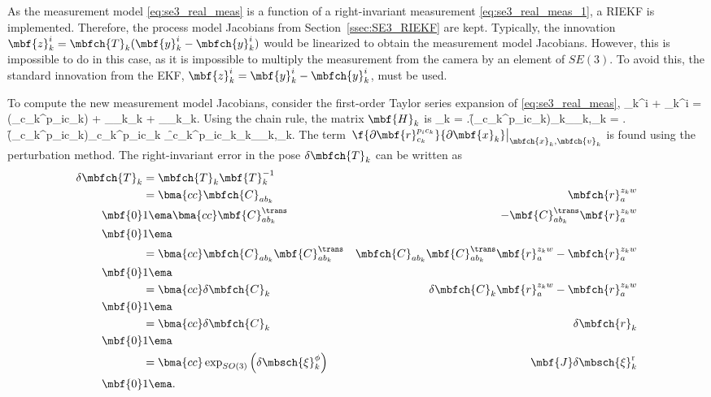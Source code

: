 As the measurement model \eqref{eq:se3_real_meas} is a function of a right-invariant measurement \eqref{eq:se3_real_meas_1}, a RIEKF is implemented. Therefore, the process model Jacobians from Section~\ref{ssec:SE3_RIEKF} are kept. Typically, the innovation $\mbf{z}_k^i = \mbfch{T}_k(\mbf{y}_k^i - \mbfch{y}_k^i)$ would be linearized to obtain the measurement model Jacobians. However, this is impossible to do in this case, as it is impossible to multiply the measurement from the camera by an element of $SE(3)$.  To avoid this, the standard innovation from the EKF, $\mbf{z}_k^i = \mbf{y}_k^i - \mbfch{y}_k^i$, must be used. 

To compute the new measurement model Jacobians, consider the first-order Taylor series expansion of \eqref{eq:se3_real_meas},
\bdis
	_k^i + _k^i =  (_{c_k}^{p_ic_k}) + _{_k}_k + _{_k}_k.
\edis
Using the chain rule, the matrix $\mbf{H}_k$ is
\bdis
	_k = \left.\f{\partial {}(_{c_k}^{p_ic_k})}{\partial {}_k}\right\rvert_{_k,_k} = \left.\f{\partial {}(_{c_k}^{p_ic_k})}{\partial  {}_{c_k}^{p_ic_k}} \f{\partial  {}_{c_k}^{p_ic_k}}{\partial {}_k}\right\rvert_{_k,_k}.
\edis
The term $\left.\f{\partial  \mbf{r}_{c_k}^{p_ic_k}}{\partial \mbf{x}_k}\right\rvert_{\mbfch{x}_k,\mbfch{v}_k}$ is found using the perturbation method. The right-invariant error in the pose $\delta \mbfch{T}_k$ can be written as
\begin{align*}
	\delta \mbfch{T}_k &= \mbfch{T}_k\mbf{T}_k^{-1} \\
	&= 
	\bma{cc}
		\mbfch{C}_{ab_k} & \mbfch{r}_a^{z_kw} \\
		\mbf{0} & 1 
	\ema
	\bma{cc}
		\mbf{C}_{ab_k}^\trans & -\mbf{C}_{ab_k}^\trans\mbf{r}_a^{z_kw} \\
		\mbf{0} & 1 
	\ema \\
	&= 
	\bma{cc}
		\mbfch{C}_{ab_k}\mbf{C}_{ab_k}^\trans & \mbfch{C}_{ab_k}\mbf{C}_{ab_k}^\trans\mbf{r}_a^{z_kw} - \mbfch{r}_a^{z_kw} \\
		\mbf{0} & 1 
	\ema \\
	&= 
	\bma{cc}
		\delta \mbfch{C}_k & \delta \mbfch{C}_k \mbf{r}_a^{z_kw} - \mbfch{r}_a^{z_kw} \\
		\mbf{0} & 1 
	\ema \\
	&= 	
	\bma{cc}
		\delta \mbfch{C}_k & \delta \mbfch{r}_k \\
		\mbf{0} & 1 
	\ema \\
	&= 
	\bma{cc}
		\exp_{SO(3)}\left({\delta \mbsch{\xi}_k^\phi}\right) & \mbf{J}\delta\mbsch{\xi}_k^\mathrm{r} \\
		\mbf{0} & 1 
	\ema.
\end{align*}
